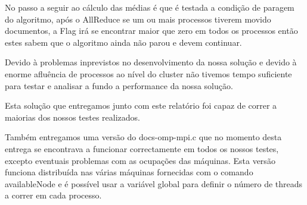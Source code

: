 \documentclass[times, 10pt,twocolumn]{article}
\begin{document}
No passo a seguir ao cálculo das médias é que é testada a condição de paragem do algoritmo, após o AllReduce se um ou mais processos tiverem movido documentos, a Flag irá se encontrar maior que zero em todos os processos então estes sabem que o algoritmo ainda não parou e devem continuar.

%
%
%
%



Devido à problemas inprevistos no desenvolvimento da nossa solução e devido à enorme afluência de processos ao nível do cluster não tivemos tempo suficiente para testar e analisar a fundo a performance da nossa solução.

Esta solução que entregamos junto com este relatório foi capaz de correr a maiorias dos nossos testes realizados.

Também entregamos uma versão do docs-omp-mpi.c que no momento desta entrega se encontrava a funcionar correctamente em todos os nossos testes, excepto eventuais problemas com as ocupações das máquinas. Esta versão funciona distribuída nas várias máquinas fornecidas com o comando availableNode e é possível usar a variável global para definir o número de threads a correr em cada processo.
\end{document}
